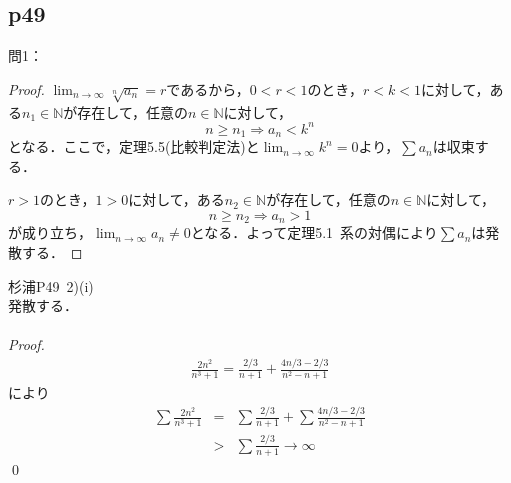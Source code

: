 \documentclass[dvipdfmx,uplatex,11pt]{jsarticle}
\theoremstyle{definition}
\begin{document}
\subsection{p49}
問1：
\begin{leftbar}
	\begin{proof}
		$\lim_{n \to \infty} \sqrt[n]{a_n} =r$であるから，$0<r<1$のとき，$r<k<1$に対して，ある$n_1 \in \mathbb{N}$が存在して，任意の$n \in \mathbb{N}$に対して，
		\[
			n \ge n_1 \Longrightarrow a_n<k^n
		\]
		となる．ここで，定理5.5(比較判定法)と$\lim_{n \to \infty} k^n =0$より，$\sum a_n$は収束する．\par 
		$r>1$のとき，$1>0$に対して，ある$n_2 \in \mathbb{N}$が存在して，任意の$n \in \mathbb{N}$に対して，
		\[
			n \ge n_2 \Longrightarrow a_n >1
		\]
		が成り立ち，$\lim_{n \to \infty} a_n \ne 0$となる．よって定理5.1~系の対偶により$\sum a_n$は発散する．
	\end{proof}
\end{leftbar}

\newpage

\begin{screen}
	杉浦P49~2)(i)\\
	発散する．\\
	\dotfill \\
	{\it Proof.}
	\begin{eqnarray*}
	\frac{2n^2}{n^3+1}=\frac{2/3}{n+1}+\frac{4n/3-2/3}{n^2-n+1}
	\end{eqnarray*}
	により
	\begin{eqnarray*}
	\sum \frac{2n^2}{n^3+1}&=&\sum \frac{2/3}{n+1}+\sum \frac{4n/3-2/3}{n^2-n+1} \\
	&>&\sum \frac{2/3}{n+1} \rightarrow \infty
	\end{eqnarray*}
	\qed
	\end{screen}
	
\end{document}
